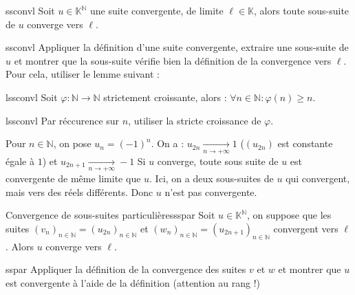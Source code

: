 \documentclass[12pt,a4paper]{report}
\begin{document}
\begin{theoreme}{}{ssconvl}
Soit $u \in \mathbb{K}^\mathbb{N}$ une suite convergente, de limite $\ell \in \mathbb{K}$, alors toute sous-suite de $u$ converge vers $\ell$.
\end{theoreme}

\begin{principedemo}{ssconvl}
Appliquer la définition d'une suite convergente, extraire une sous-suite de $u$ et montrer que la sous-suite vérifie bien la définition de la convergence vers $\ell$. Pour cela, utiliser le lemme suivant :
\end{principedemo}

\begin{lemme}{}{lssconvl}
Soit $\varphi : \mathbb{N} \rightarrow \mathbb{N}$ strictement croissante, alors : $\forall n \in \mathbb{N} : \varphi(n) \geq n$.
\end{lemme}

\begin{principedemo}{lssconvl}
Par réccurence sur $n$, utiliser la stricte croissance de $\varphi$.
\end{principedemo}


\begin{exemple}
Pour $n \in \mathbb{N}$, on pose $u_n = (-1)^n$. On a : $u_{2n} \xrightarrow[n \rightarrow + \infty]{} 1$ ($(u_{2n})$ est constante égale à $1$) et $u_{2n+1} \xrightarrow[n \rightarrow + \infty]{} -1$ 
Si $u$ converge, toute sous suite de $u$ est convergente de même limite que $u$. Ici, on a deux sous-suites de $u$ qui convergent, mais vers des réels différents. Donc $u$ n'est pas convergente.
\end{exemple}

\begin{theoreme}{Convergence de sous-suites particulières}{sspar}
Soit $u \in \mathbb{K}^\mathbb{N}$, on suppose que les suites $(v_n)_{n \in \mathbb{N}} = (u_{2n})_{n \in \mathbb{N}}$ et $(w_n)_{n \in \mathbb{N}} = (u_{2n+1})_{n \in \mathbb{N}}$ convergent vers $\ell$. Alors $u$ converge vers $\ell$.
\end{theoreme}

\begin{principedemo}{sspar}
Appliquer la définition de la convergence des suites $v$ et $w$ et montrer que $u$ est convergente à l'aide de la définition (attention au rang !)
\end{principedemo}
\end{document}

